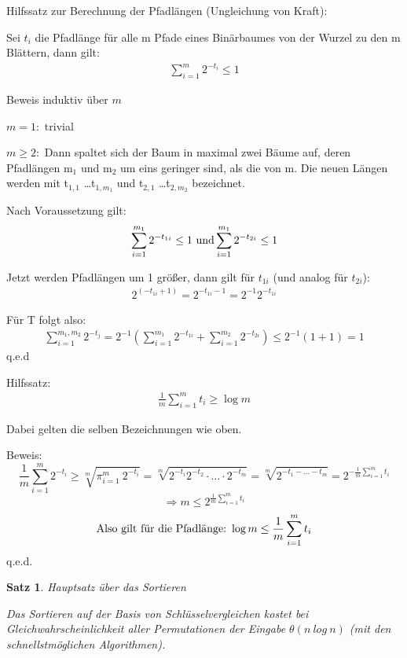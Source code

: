 \documentclass[ngerman,draft,parskip=half*,twoside]{scrreprt}
\theoremstyle{break}
\newtheorem{satz}{Satz}
\begin{document}
% 
Hilfssatz zur Berechnung der Pfadlängen (Ungleichung von Kraft):

\noindent
Sei $t_{i}$ die Pfadlänge für alle m Pfade eines Binärbaumes von der Wurzel zu den m Blättern, dann gilt:
\begin{gather*}
\sum_{i=1}^{m} 2^{-t_{i}}\leq 1
\end{gather*} 


Beweis induktiv über $m$

\noindent
$m = 1:$ trivial

\noindent
$m \geq 2:$ Dann spaltet sich der Baum in maximal zwei Bäume auf, deren Pfadlängen m$_1$ und m$_2$ um eins geringer sind, als die
von m. Die neuen Längen werden mit t$_{1,1}$ \ldots t$_{1,m_1}$ und t$_{2,1}$ \ldots t$_{2,m_2}$ bezeichnet.
\bigskip

Nach Voraussetzung gilt:
\begin{gather*}
\sum_{i=1}^{m_{1}} 2^{-t_{1i}}\leq 1\ \textup{und}  \sum_{i=1}^{m_{1}} 2^{-t_{2i}}\leq 1
\end{gather*}

Jetzt werden Pfadlängen um 1 größer, dann gilt für $t_{1i}$ (und analog für $t_{2i}$):
\begin{gather*}
2^{(-t_{1i}+1)}=2^{-t_{1i}-1}=2^{-1} 2^{-t_{1i}}
\end{gather*}

Für T folgt also:
\begin{gather*}
\sum_{i=1}^{m_1,  m_2} 2^{-t_{j}}=2^{-1}\left(\sum_{i=1}^{m_{1}} 2^{-t_{1i}}+\sum_{i=1}^{m_{2}} 2^{-t_{2i}}\right)
\leq 2^{-1}(1+1)=1
\end{gather*}
\hfill  q.e.d

Hilfssatz:
\begin{gather*}
\frac{1}{m}  \sum_{i=1}^{m}t_{i}\geq \log m
\end{gather*}

Dabei gelten die selben Bezeichnungen wie oben.

Beweis:
\[
\frac{1}{m}   \sum_{i=1}^{m}2^{-t_{i}} \geq \sqrt[m]{\pi_{i=1}^{m}\ 2^{-t_{i}}}=\sqrt[m]{2^{-t_i}  2^{-t_2}\cdot \ldots \cdot 2^{-t_m}}
=\sqrt[m]{2^{-t_1-  \ldots   -t_m}}= 2^{-\frac{1}{m}\sum_{i=1}^{m}t_i}
\]
\[
\Rightarrow m \leq 2^{\frac{1}{m}  \sum_{i=1}^{m}t_i}
\]
\[
\textup{Also gilt für die Pfadlänge:}\ \log m \leq\frac{1}{m}  \sum_{i=1}^{m}t_i
\]
\hfill q.e.d.

\begin{satz}
Hauptsatz über das Sortieren

Das Sortieren auf der Basis von Schlüsselvergleichen kostet bei Gleichwahrscheinlichkeit aller Permutationen der Eingabe
$\theta (n\ log\ n)$ (mit den schnellstmöglichen Algorithmen).
\end{satz}
\end{document}
